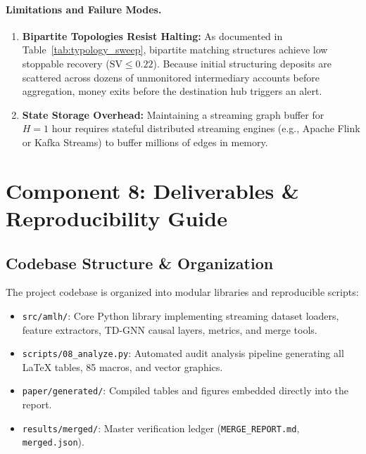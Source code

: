 \documentclass[11pt,a4paper]{article}
\begin{document}
\paragraph{Limitations and Failure Modes.}
\begin{enumerate}[leftmargin=*]
    \item \textbf{Bipartite Topologies Resist Halting:} As documented in Table~\ref{tab:typology_sweep}, bipartite matching structures achieve low stoppable recovery ($\text{SV} \le 0.22$). Because initial structuring deposits are scattered across dozens of unmonitored intermediary accounts before aggregation, money exits before the destination hub triggers an alert.
    \item \textbf{State Storage Overhead:} Maintaining a streaming graph buffer for $H=1\text{ hour}$ requires stateful distributed streaming engines (e.g., Apache Flink or Kafka Streams) to buffer millions of edges in memory.
\end{enumerate}

\section{Component 8: Deliverables \& Reproducibility Guide}
\label{sec:comp8_deliverables}

\subsection{Codebase Structure \& Organization}
The project codebase is organized into modular libraries and reproducible scripts:
\begin{itemize}[leftmargin=*]
    \item \texttt{src/amlh/}: Core Python library implementing streaming dataset loaders, feature extractors, TD-GNN causal layers, metrics, and merge tools.
    \item \texttt{scripts/08\_analyze.py}: Automated audit analysis pipeline generating all LaTeX tables, 85 macros, and vector graphics.
    \item \texttt{paper/generated/}: Compiled tables and figures embedded directly into the report.
    \item \texttt{results/merged/}: Master verification ledger (\texttt{MERGE\_REPORT.md}, \texttt{merged.json}).
\end{itemize}
\end{document}
